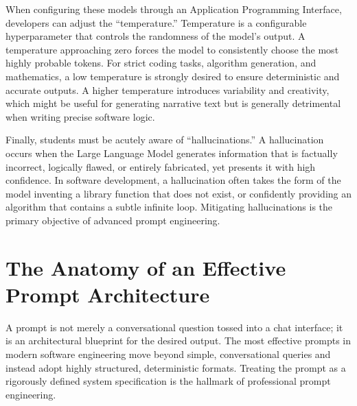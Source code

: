 \documentclass[12pt]{article}
\begin{document}
When configuring
these models through an Application Programming Interface, developers can adjust the ``temperature.''
Temperature is a configurable hyperparameter that controls the randomness of the model's output. A temperature
approaching zero forces the model to consistently choose the most highly probable tokens. For strict coding
tasks, algorithm generation, and mathematics, a low temperature is strongly desired to ensure deterministic and
accurate outputs. A higher temperature introduces variability and creativity, which might be useful for
generating narrative text but is generally detrimental when writing precise software logic.

Finally, students
must be acutely aware of ``hallucinations.'' A hallucination occurs when the Large Language Model generates
information that is factually incorrect, logically flawed, or entirely fabricated, yet presents it with high
confidence. In software development, a hallucination often takes the form of the model inventing a
library function that does not exist, or confidently providing an algorithm that contains a subtle infinite
loop. Mitigating hallucinations is the primary objective of advanced prompt engineering. 

\section{The Anatomy of an Effective Prompt Architecture}
A prompt is not merely a conversational question
tossed into a chat interface; it is an architectural blueprint for the desired output. The most effective
prompts in modern software engineering move beyond simple, conversational queries and instead adopt highly
structured, deterministic formats. Treating the prompt as a rigorously defined system specification is the
hallmark of professional prompt engineering. 
\end{document}
